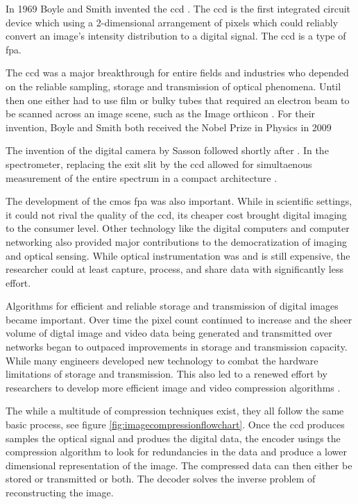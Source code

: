 In 1969 Boyle and Smith invented the \gls{ccd} \cite{boyle1970charge}. The \gls{ccd} is the first integrated circuit device which using a 2-dimensional arrangement of pixels which could reliably convert an image's intensity distribution to a digital signal. The \gls{ccd} is a type of \gls{fpa}. 

The \gls{ccd} was a major breakthrough for entire fields and industries who depended on the reliable sampling, storage and transmission of optical phenomena. Until then one either had to use film or bulky tubes that required an electron beam to be scanned across an image scene, such as the Image orthicon \cite{w1975image}. For their invention, Boyle and Smith both received the Nobel Prize in Physics in 2009 \cite{nobelprize2009physics}

The invention of the digital camera by Sasson followed shortly after \cite{kodaksfirstdigital2015}. In the spectrometer, replacing the exit slit by the \gls{ccd} allowed for simultaenous measurement of the entire spectrum in a compact architecture \cite{moore1979spectrometer}. 

The development of the \gls{cmos} \gls{fpa} was also important. While in scientific settings, it could not rival the quality of the \gls{ccd}, its cheaper cost brought digital imaging to the consumer level. Other technology like the digital computers and computer networking also provided major contributions to the democratization of imaging and optical sensing. While optical instrumentation was and is still expensive, the researcher could at least capture, process, and share data with significantly less effort. 

Algorithms for efficient and reliable storage and transmission of digital images became important. Over time the pixel count continued to increase and the sheer volume of digtal image and video data being generated and transmitted over networks began to outpaced improvements in storage and transmission capacity. While many engineers developed new technology to combat the hardware limitations of storage and transmission. This also led to a renewed effort by researchers to develop more efficient image and video compression algorithms \cite{kobayashi1974image, ziv1978compression}. 

The while a multitude of compression techniques exist, they all follow the same basic process, see figure \ref{fig:imagecompressionflowchart}. Once the \gls{ccd} produces samples the optical signal and produes the digital data, the encoder usings the compression algorithm to look for redundancies in the data and produce a lower dimensional representation of the image. The compressed data can then either be stored or transmitted or both. The decoder solves the inverse problem of reconstructing the image. 

